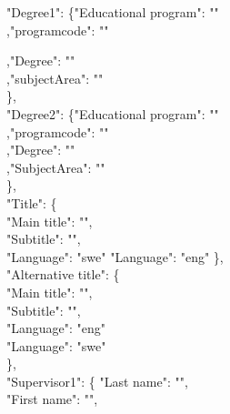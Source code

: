{\begin{flushleft}
       "Degree1": \{"Educational program": "\@prgmcode"\\ %
       \ifx\@programcode\@empty\relax
       \else
       ,"programcode": "\@programcode"\\
       \fi

        \ifx\@degreeName\@empty\relax
       \else
       ,"Degree": "\@degreeName"\\
       \fi
        \ifx\@subjectArea\@empty\relax
       \else
       ,"subjectArea": "\@subjectArea"\\
       \fi
       \},\\
       \ifx\@secondProgramcode\@empty\relax            %
       \else
        "Degree2": \{"Educational program": "\@secondprgmcode"\\
        \ifx\@secondProgramcode\@empty\relax
         \else
         ,"programcode": "\@secondProgramcode"\\
         \fi
         \ifx\@secondDegreeName\@empty\relax
        \else
        ,"Degree": "\@secondDegreeName"\\
        \fi
            \ifx\@secondSubjectArea\@empty\relax
        \else
         ,"SubjectArea": "\@secondSubjectArea"\\
         \fi
         \},\\
       \fi
       "Title": \{\\
       "Main title": "\@title",\\
       \ifx\@subtitle\@empty\relax
       \else
       "Subtitle": "\@subtitle",\\
       \fi
       \ifinswedish
       "Language": "swe"
       \else
       "Language": "eng"
       \fi
       \},\\
    "Alternative title": \{\\
    "Main title": "\@alttitle",\\
    \ifx\@altsubtitle\@empty\relax
    \else
    "Subtitle": "\@altsubtitle",\\
    \fi
    \ifinswedish
    "Language": "eng"\\
    \else
    "Language": "swe"\\
    \fi
    \},\\
     \ifx\@supervisorAsLastname\@empty\relax
        \else
    "Supervisor1": \{ "Last name": "\@supervisorAsLastname",\\
    \ifx\@supervisorAsFirstname\@empty\relax
    \else
    "First name": "\@supervisorAsFirstname",\\

\end{flushleft}}

